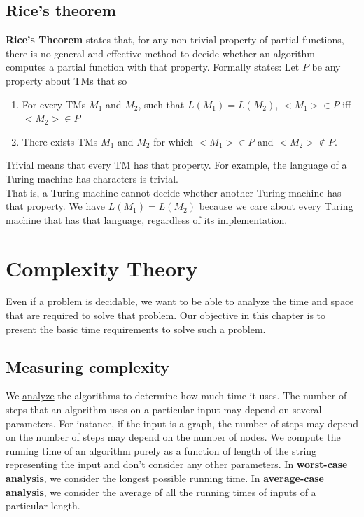\documentclass[a4paper]{article}
\begin{document}
\subsection{Rice's theorem} %
\label{sub:Rice's theorem}
{\bf Rice's Theorem} states that, for any non-trivial property of partial functions, there is no general and effective method to decide whether an algorithm computes a partial function with that property. Formally states:
Let $P$ be any property about TMs that so
\begin{enumerate}
  \item For every TMs $M_1$ and $M_2$, such that $L(M_1)=L(M_2)$, $<M_1>\in P$ iff $<M_2> \in P$
  \item There exists TMs $M_1$ and $M_2$ for which $<M_1>\in P$ and $<M_2> \notin P$.
\end{enumerate}
Trivial means that every TM has that property. For example, the language of a Turing machine has characters is trivial. \\
That is, a Turing machine cannot decide whether another Turing machine has that property. We have $L(M_1)=L(M_2)$ because we care about every Turing machine that has that language, regardless of its implementation.
\section{Complexity Theory} %
\label{sec:Complexity Theory}
Even if a problem is decidable, we want to be able to analyze the time and space that are required to solve that problem. Our objective in this chapter is to present the basic time requirements to solve such a problem. 
\subsection{Measuring complexity} %
\label{sub:Measuring complexity}
We \underline{analyze} the algorithms to determine how much time it uses. The number of steps that an algorithm uses on a particular input may depend on several parameters. For instance, if the input is a graph, the number of steps may depend on the number of steps may depend on the number of nodes. We compute the running time of an algorithm purely as a function of length of the string representing the input and don't consider any other parameters. In {\bf worst-case analysis}, we consider the longest possible running time. In {\bf average-case analysis}, we consider the average of all the running times of inputs of a particular length. \\
\end{document}
